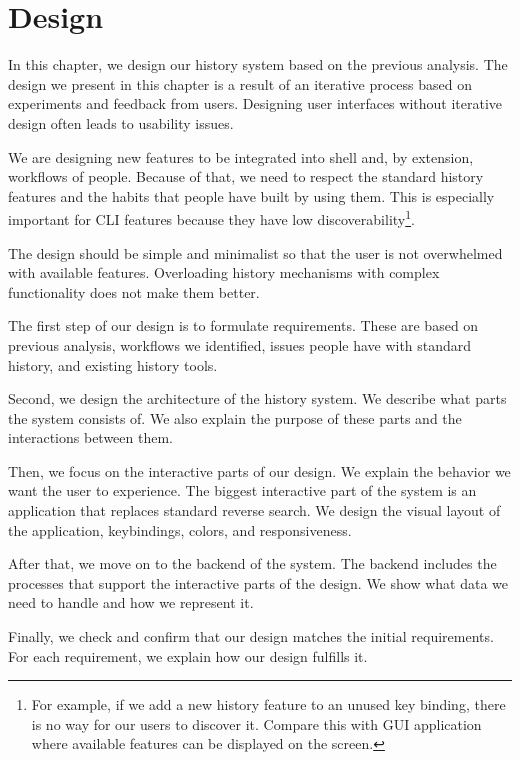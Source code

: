 
\chapter{Design}

In this chapter, we design our history system based on the previous analysis.
The design we present in this chapter is a result of an iterative process based on experiments and feedback from users. Designing user interfaces without iterative design often leads to usability issues.\cite{nielsen1993iterative}
    
We are designing new features to be integrated into shell and, by extension, workflows of people. Because of that, we need to respect the standard history features and the habits that people have built by using them. This is especially important for CLI features because they have low discoverability\footnote{For example, if we add a new history feature to an unused key binding, there is no way for our users to discover it. Compare this with GUI application where available features can be displayed on the screen.}.


The design should be simple and minimalist so that the user is not overwhelmed with available features. Overloading history mechanisms with complex functionality does not make them better.\cite{greenberg1993computer}


The first step of our design is to formulate requirements. These are based on previous analysis, workflows we identified, issues people have with standard history, and existing history tools. 

Second, we design the architecture of the history system. We describe what parts the system consists of. We also explain the purpose of these parts and the interactions between them.

%
Then, we focus on the interactive parts of our design. We explain the behavior we want the user to experience. The biggest interactive part of the system is an application that replaces standard reverse search. We design the visual layout of the application, keybindings, colors, and responsiveness. 

After that, we move on to the backend of the system. The backend includes the processes that support the interactive parts of the design. We show what data we need to handle and how we represent it.

Finally, we check and confirm that our design matches the initial requirements. For each requirement, we explain how our design fulfills it.


